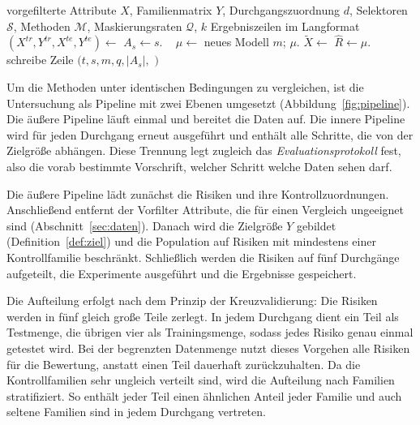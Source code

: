 \begin{algorithm}[htbp]
\caption[Evaluationsprotokoll]{Evaluationsprotokoll über alle Durchgänge}
\label{alg:protokoll}
\begin{algorithmic}[1]
\REQUIRE vorgefilterte Attribute $X$, Familienmatrix $Y$, Durchgangszuordnung $d$,
  Selektoren $\mathcal{S}$, Methoden $\mathcal{M}$, Maskierungsraten $\mathcal{Q}$, $k$
\ENSURE Ergebniszeilen im Langformat
  \STATE $(X^{tr}, Y^{tr}, X^{te}, Y^{te}) \leftarrow$ 
    \STATE $A_s \leftarrow s.$ \ 
      \STATE $\mu \leftarrow$ neues Modell $m$; $\mu.$
        \STATE $\tilde{X} \leftarrow$ 
        \STATE $\hat{R} \leftarrow \mu.$ \ 
        \STATE schreibe Zeile $(t, s, m, q, |A_s|,$ $)$
      \ENDFOR
    \ENDFOR
  \ENDFOR
\ENDFOR
\end{algorithmic}
\end{algorithm}
Um die Methoden unter identischen Bedingungen zu vergleichen, ist die Untersuchung als Pipeline mit zwei Ebenen umgesetzt (Abbildung~\ref{fig:pipeline}). 
Die äußere Pipeline läuft einmal und bereitet die Daten auf. Die innere Pipeline wird für jeden Durchgang erneut ausgeführt und enthält alle Schritte, die von der Zielgröße abhängen.
Diese Trennung legt zugleich das \emph{Evaluationsprotokoll} fest, also die vorab bestimmte Vorschrift, welcher Schritt welche Daten sehen darf.

Die äußere Pipeline lädt zunächst die Risiken und ihre Kontrollzuordnungen. Anschließend entfernt der Vorfilter Attribute, die für einen Vergleich ungeeignet sind (Abschnitt~\ref{sec:daten}). 
Danach wird die Zielgröße $Y$ gebildet (Definition~\ref{def:ziel}) und die Population auf Risiken mit mindestens einer Kontrollfamilie beschränkt. 
Schließlich werden die Risiken auf fünf Durchgänge aufgeteilt, die Experimente ausgeführt und die Ergebnisse gespeichert.

Die Aufteilung erfolgt nach dem Prinzip der Kreuzvalidierung: Die Risiken werden in fünf gleich große Teile zerlegt. 
In jedem Durchgang dient ein Teil als Testmenge, die übrigen vier als Trainingsmenge, sodass jedes Risiko genau einmal getestet wird. 
Bei der begrenzten Datenmenge nutzt dieses Vorgehen alle Risiken für die Bewertung, anstatt einen Teil dauerhaft zurückzuhalten. 
Da die Kontrollfamilien sehr ungleich verteilt sind, wird die Aufteilung nach Familien stratifiziert. 
So enthält jeder Teil einen ähnlichen Anteil jeder Familie und auch seltene Familien sind in jedem Durchgang vertreten.

